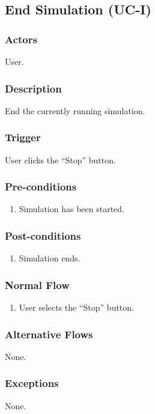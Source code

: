 \documentclass[a4paper,11pt,titlepage]{article}
\begin{document}
\subsection{End Simulation (UC-I)}
\subsubsection{Actors}
User.
\subsubsection{Description}
End the currently running simulation.
\subsubsection{Trigger}
User clicks the ``Stop'' button.
\subsubsection{Pre-conditions}

\begin{enumerate}
  \item Simulation has been started.
\end{enumerate}

\subsubsection{Post-conditions}

\begin{enumerate}
  \item Simulation ends.
\end{enumerate}

\subsubsection{Normal Flow}
\begin{enumerate}
  \item User selects the ``Stop'' button.
\end{enumerate}

\subsubsection{Alternative Flows}
None.

\subsubsection{Exceptions}
None.
\end{document}
